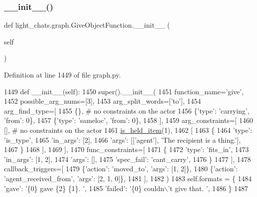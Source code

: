 \subsubsection{\texorpdfstring{\+\_\+\+\_\+init\+\_\+\+\_\+()}{\_\_init\_\_()}}
{\footnotesize\ttfamily def light\+\_\+chats.\+graph.\+Give\+Object\+Function.\+\_\+\+\_\+init\+\_\+\+\_\+ (\begin{DoxyParamCaption}\item[{}]{self }\end{DoxyParamCaption})}



Definition at line 1449 of file graph.\+py.


\begin{DoxyCode}
1449     \textcolor{keyword}{def }\_\_init\_\_(self):
1450         super().\_\_init\_\_(
1451             function\_name=\textcolor{stringliteral}{'give'},
1452             possible\_arg\_nums=[3],
1453             arg\_split\_words=[\textcolor{stringliteral}{'to'}],
1454             arg\_find\_type=[
1455                 \{\},  \textcolor{comment}{# no constraints on the actor}
1456                 \{\textcolor{stringliteral}{'type'}: \textcolor{stringliteral}{'carrying'}, \textcolor{stringliteral}{'from'}: 0\},
1457                 \{\textcolor{stringliteral}{'type'}: \textcolor{stringliteral}{'sameloc'}, \textcolor{stringliteral}{'from'}: 0\},
1458             ],
1459             arg\_constraints=[
1460                 [],  \textcolor{comment}{# no constraints on the actor}
1461                 \hyperlink{namespacelight__chats_1_1graph_aa0be6ee7e9f549a7195bea9dfb962ad6}{is\_held\_item}(1),
1462                 [
1463                     \{
1464                         \textcolor{stringliteral}{'type'}: \textcolor{stringliteral}{'is\_type'},
1465                         \textcolor{stringliteral}{'in\_args'}: [2],
1466                         \textcolor{stringliteral}{'args'}: [[\textcolor{stringliteral}{'agent'}], \textcolor{stringliteral}{'The recipient is a thing.'}],
1467                     \}
1468                 ],
1469             ],
1470             func\_constraints=[
1471                 \{
1472                     \textcolor{stringliteral}{'type'}: \textcolor{stringliteral}{'fits\_in'},
1473                     \textcolor{stringliteral}{'in\_args'}: [1, 2],
1474                     \textcolor{stringliteral}{'args'}: [],
1475                     \textcolor{stringliteral}{'spec\_fail'}: \textcolor{stringliteral}{'cant\_carry'},
1476                 \}
1477             ],
1478             callback\_triggers=[
1479                 \{\textcolor{stringliteral}{'action'}: \textcolor{stringliteral}{'moved\_to'}, \textcolor{stringliteral}{'args'}: [1, 2]\},
1480                 \{\textcolor{stringliteral}{'action'}: \textcolor{stringliteral}{'agent\_received\_from'}, \textcolor{stringliteral}{'args'}: [2, 1, 0]\},
1481             ],
1482         )
1483         self.formats = \{
1484             \textcolor{stringliteral}{'gave'}: \textcolor{stringliteral}{'\{0\} gave \{2\} \{1\}. '},
1485             \textcolor{stringliteral}{'failed'}: \textcolor{stringliteral}{'\{0\} couldn\(\backslash\)'t give that. '},
1486         \}
1487 
\end{DoxyCode}


